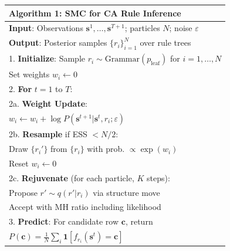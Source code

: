 \documentclass[10pt,letterpaper]{article}
\begin{document}
\begin{figure}[H]
\small
\begin{tabular}{p{}}
\hline
\textbf{Algorithm 1}: SMC for CA Rule Inference \\
\hline
\textbf{Input}: Observations $\mathbf{s}^1, \ldots, \mathbf{s}^{T+1}$; particles $N$; noise $\varepsilon$ \\
\textbf{Output}: Posterior samples $\{r_i\}_{i=1}^N$ over rule trees \\[0.3em]
1. \textbf{Initialize}: Sample $r_i \sim \text{Grammar}(p_{\text{leaf}})$ for $i = 1, \ldots, N$ \\
\quad Set weights $w_i \leftarrow 0$ \\[0.3em]
2. \textbf{For} $t = 1$ to $T$: \\
\quad 2a. \textbf{Weight Update}: \\
\quad\quad $w_i \leftarrow w_i + \log P(\mathbf{s}^{t+1} | \mathbf{s}^t, r_i; \varepsilon)$ \\[0.2em]
\quad 2b. \textbf{Resample} if ESS $< N/2$: \\
\quad\quad Draw $\{r_i'\}$ from $\{r_i\}$ with prob. $\propto \exp(w_i)$ \\
\quad\quad Reset $w_i \leftarrow 0$ \\[0.2em]
\quad 2c. \textbf{Rejuvenate} (for each particle, $K$ steps): \\
\quad\quad Propose $r' \sim q(r' | r_i)$ via structure move \\
\quad\quad Accept with MH ratio including likelihood \\[0.3em]
3. \textbf{Predict}: For candidate row $\mathbf{c}$, return \\
\quad $P(\mathbf{c}) = \frac{1}{N} \sum_i \mathbf{1}[f_{r_i}(\mathbf{s}^t) = \mathbf{c}]$ \\
\hline
\end{tabular}
\label{alg:smc}
\end{figure}
\end{document}
